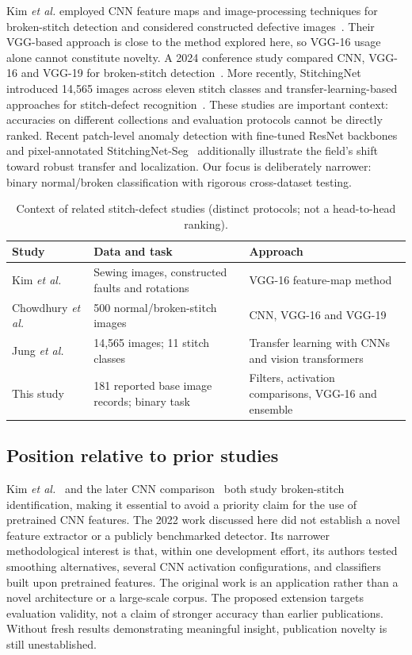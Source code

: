 \documentclass[conference,a4paper]{IEEEtran}
\begin{document}
Kim \emph{et al.} employed CNN feature maps and image-processing techniques for broken-stitch detection and considered constructed defective images~\cite{kim}. Their VGG-based approach is close to the method explored here, so VGG-16 usage alone cannot constitute novelty. A 2024 conference study compared CNN, VGG-16 and VGG-19 for broken-stitch detection~\cite{chowdhury}. More recently, StitchingNet introduced 14,565 images across eleven stitch classes and transfer-learning-based approaches for stitch-defect recognition~\cite{stitchingnet}. These studies are important context: accuracies on different collections and evaluation protocols cannot be directly ranked. Recent patch-level anomaly detection with fine-tuned ResNet backbones~\cite{patchcore2026} and pixel-annotated StitchingNet-Seg~\cite{stitchingnetseg2026} additionally illustrate the field's shift toward robust transfer and localization. Our focus is deliberately narrower: binary normal/broken classification with rigorous cross-dataset testing.

\begin{table}[!t]
\centering
\caption{Context of related stitch-defect studies (distinct protocols; not a head-to-head ranking).}
\label{tab:related}
\setlength{\tabcolsep}{2.5pt}
\scriptsize
\begin{tabular}{p{}p{}p{}}
\toprule
Study & Data and task & Approach \\
\midrule
Kim \emph{et al.}~\cite{kim} & Sewing images, constructed faults and rotations & VGG-16 feature-map method \\
Chowdhury \emph{et al.}~\cite{chowdhury} & 500 normal/broken-stitch images & CNN, VGG-16 and VGG-19 \\
Jung \emph{et al.}~\cite{stitchingnet} & 14,565 images; 11 stitch classes & Transfer learning with CNNs and vision transformers \\
This study & 181 reported base image records; binary task & Filters, activation comparisons, VGG-16 and ensemble \\
\bottomrule
\end{tabular}
\end{table}

\subsection{Position relative to prior studies}
Kim \emph{et al.}~\cite{kim} and the later CNN comparison~\cite{chowdhury} both study broken-stitch identification, making it essential to avoid a priority claim for the use of pretrained CNN features. The 2022 work discussed here did not establish a novel feature extractor or a publicly benchmarked detector. Its narrower methodological interest is that, within one development effort, its authors tested smoothing alternatives, several CNN activation configurations, and classifiers built upon pretrained features. The original work is an application rather than a novel architecture or a large-scale corpus. The proposed extension targets evaluation validity, not a claim of stronger accuracy than earlier publications. Without fresh results demonstrating meaningful insight, publication novelty is still unestablished.
\end{document}
